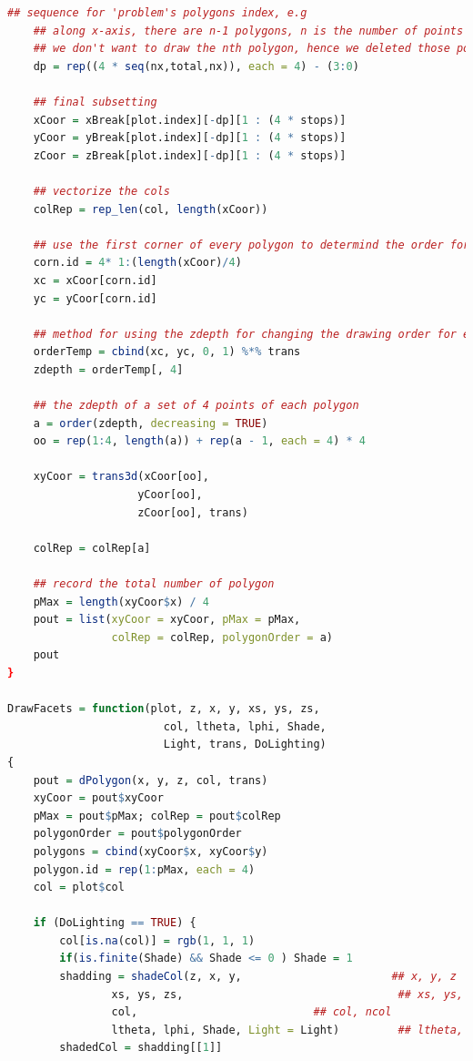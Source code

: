 \documentclass{report}
\begin{document}
\begin{lstlisting}[language = R]
    ## sequence for 'problem's polygons index, e.g
    ## along x-axis, there are n-1 polygons, n is the number of points in x direction
    ## we don't want to draw the nth polygon, hence we deleted those polygon
    dp = rep((4 * seq(nx,total,nx)), each = 4) - (3:0)

    ## final subsetting
    xCoor = xBreak[plot.index][-dp][1 : (4 * stops)]
    yCoor = yBreak[plot.index][-dp][1 : (4 * stops)]
    zCoor = zBreak[plot.index][-dp][1 : (4 * stops)]
    
    ## vectorize the cols
    colRep = rep_len(col, length(xCoor))
    
    ## use the first corner of every polygon to determind the order for drawing
    corn.id = 4* 1:(length(xCoor)/4)
    xc = xCoor[corn.id]
    yc = yCoor[corn.id]
    
    ## method for using the zdepth for changing the drawing order for every polygon
    orderTemp = cbind(xc, yc, 0, 1) %*% trans 
    zdepth = orderTemp[, 4]

    ## the zdepth of a set of 4 points of each polygon
    a = order(zdepth, decreasing = TRUE)
    oo = rep(1:4, length(a)) + rep(a - 1, each = 4) * 4

    xyCoor = trans3d(xCoor[oo],
                    yCoor[oo],
                    zCoor[oo], trans)
                    
    colRep = colRep[a]
    
    ## record the total number of polygon
    pMax = length(xyCoor$x) / 4
    pout = list(xyCoor = xyCoor, pMax = pMax, 
                colRep = colRep, polygonOrder = a)
    pout
}

DrawFacets = function(plot, z, x, y, xs, ys, zs, 
                        col, ltheta, lphi, Shade,
                        Light, trans, DoLighting)
{
    pout = dPolygon(x, y, z, col, trans)
    xyCoor = pout$xyCoor
    pMax = pout$pMax; colRep = pout$colRep
    polygonOrder = pout$polygonOrder
    polygons = cbind(xyCoor$x, xyCoor$y)
    polygon.id = rep(1:pMax, each = 4)
    col = plot$col
    
    if (DoLighting == TRUE) {
        col[is.na(col)] = rgb(1, 1, 1)
        if(is.finite(Shade) && Shade <= 0 ) Shade = 1
        shadding = shadeCol(z, x, y,                       ## x, y, z
                xs, ys, zs,                                 ## xs, ys, zs 
                col,                           ## col, ncol
                ltheta, lphi, Shade, Light = Light)         ## ltheta, lphi, Shade(not shade)
        shadedCol = shadding[[1]]
        

\end{lstlisting}
\end{document}
